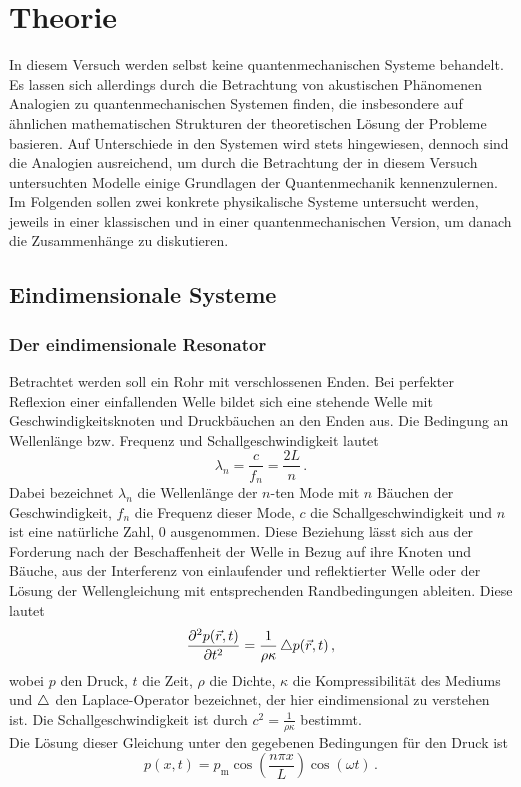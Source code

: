 \section{Theorie}
\label{sec:Theorie}
In diesem Versuch werden selbst keine quantenmechanischen Systeme behandelt. Es lassen sich allerdings durch die Betrachtung von akustischen Phänomenen Analogien zu quantenmechanischen Systemen finden, die insbesondere auf ähnlichen mathematischen Strukturen der theoretischen Lösung der Probleme basieren. Auf Unterschiede in den Systemen wird stets hingewiesen, dennoch sind die Analogien ausreichend, um durch die Betrachtung der in diesem Versuch untersuchten Modelle einige Grundlagen der Quantenmechanik kennenzulernen. Im Folgenden sollen zwei konkrete physikalische Systeme untersucht werden, jeweils in einer klassischen und in einer quantenmechanischen Version, um danach die Zusammenhänge zu diskutieren.

\subsection{Eindimensionale Systeme}
\label{subsec:eindimsyst}
\subsubsection{Der eindimensionale Resonator}
Betrachtet werden soll ein Rohr mit verschlossenen Enden. Bei perfekter Reflexion einer einfallenden Welle bildet sich eine stehende Welle mit Geschwindigkeitsknoten und Druckbäuchen an den Enden aus. Die Bedingung an Wellenlänge bzw. Frequenz und Schallgeschwindigkeit lautet
\begin{equation}
  \lambda_n = \frac{c}{f_n} = \frac{2L}{n}\,.
  \label{eqn:stehendeWelle}
\end{equation}
Dabei bezeichnet $\lambda_n$ die Wellenlänge der $n$-ten Mode mit $n$ Bäuchen der Geschwindigkeit, $f_n$ die Frequenz dieser Mode, $c$ die Schallgeschwindigkeit und $n$ ist eine natürliche Zahl, 0 ausgenommen.
Diese Beziehung lässt sich aus der Forderung nach der Beschaffenheit der Welle in Bezug auf ihre Knoten und Bäuche, aus der Interferenz von einlaufender und reflektierter Welle oder der Lösung der Wellengleichung mit entsprechenden Randbedingungen ableiten. Diese lautet
\begin{equation}
  \frac{\partial^2 p(\vec{r},t)}{\partial t^2} = \frac{1}{\rho \kappa} \mathop{}\!\mathbin\bigtriangleup p(\vec{r},t)\,,
  \label{eqn:wellengleichung}
\end{equation}
wobei $p$ den Druck, $t$ die Zeit, $\rho$ die Dichte, $\kappa$ die Kompressibilität des Mediums und $\mathop{}\!\mathbin\bigtriangleup$ den Laplace-Operator bezeichnet, der hier eindimensional zu verstehen ist. Die Schallgeschwindigkeit ist durch $c^2 = \frac{1}{\rho \kappa}$ bestimmt.\\
Die Lösung dieser Gleichung unter den gegebenen Bedingungen für den Druck ist
\begin{equation}
  p(x,t) = p_\text{m} \cos\left(\frac{n \pi x}{L}\right) \cos(\omega t)\,.
  \label{eqn:stehendeWelle2}
\end{equation}

